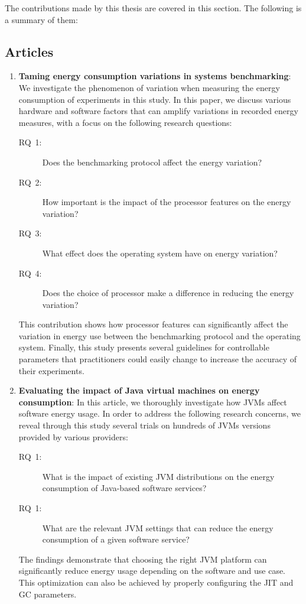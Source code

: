 The contributions made by this thesis are covered in this section. The following is a summary of them:

\subsection*{Articles}
\begin{enumerate}
      \item \textbf{Taming energy consumption variations in systems benchmarking}: We investigate the phenomenon of variation when measuring the energy consumption of experiments in this study. In this paper, we discuss various hardware and software factors that can amplify variations in recorded energy measures, with a focus on the following research questions:
      \begin{description}
            \item[\textsc{RQ}~1:] Does the benchmarking protocol affect the energy variation?
            \item[\textsc{RQ}~2:] How important is the impact of the processor features on the energy variation?
            \item[\textsc{RQ}~3:] What effect does the operating system have on energy variation?
            \item[\textsc{RQ}~4:] Does the choice of processor make a difference in reducing the energy variation?
      \end{description}
        
      This contribution shows how processor features can significantly affect the variation in energy use between the benchmarking protocol and the operating system. Finally, this study presents several guidelines for controllable parameters that practitioners could easily change to increase the accuracy of their experiments. 



      \item \textbf{Evaluating the impact of Java virtual machines on energy consumption}: In this article, we thoroughly investigate how JVMs affect software energy usage. In order to address the following research concerns, we reveal through this study several trials on hundreds of JVMs versions provided by various providers:
      \begin{description}
            \item[\textsc{RQ}~1:] What is the impact of existing JVM distributions on the energy consumption of Java-based software services?
            \item [\textsc{RQ}~1:] What are the relevant JVM settings that can reduce the energy consumption of a given software service?
        \end{description}
        The findings demonstrate that choosing the right JVM platform can significantly reduce energy usage depending on the software and use case. This optimization can also be achieved by properly configuring the JIT and GC parameters.

\end{enumerate}



